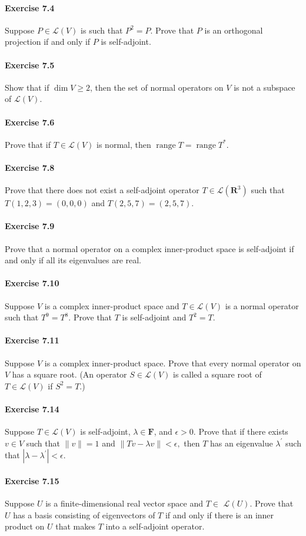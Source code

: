 \documentclass{article}
\theoremstyle{definition}
\begin{document}
\paragraph{Exercise 7.4} Suppose $P \in \mathcal{L}(V)$ is such that $P^{2}=P$. Prove that $P$ is an orthogonal projection if and only if $P$ is self-adjoint.

\paragraph{Exercise 7.5} Show that if $\operatorname{dim} V \geq 2$, then the set of normal operators on $V$ is not a subspace of $\mathcal{L}(V)$.

\paragraph{Exercise 7.6} Prove that if $T \in \mathcal{L}(V)$ is normal, then $\operatorname{range} T=\operatorname{range} T^{*}.$

\paragraph{Exercise 7.8} Prove that there does not exist a self-adjoint operator $T \in \mathcal{L}\left(\mathbf{R}^{3}\right)$ such that $T(1,2,3)=(0,0,0)$ and $T(2,5,7)=(2,5,7)$.

\paragraph{Exercise 7.9} Prove that a normal operator on a complex inner-product space is self-adjoint if and only if all its eigenvalues are real.

\paragraph{Exercise 7.10} Suppose $V$ is a complex inner-product space and $T \in \mathcal{L}(V)$ is a normal operator such that $T^{9}=T^{8}$. Prove that $T$ is self-adjoint and $T^{2}=T$.

\paragraph{Exercise 7.11} Suppose $V$ is a complex inner-product space. Prove that every normal operator on $V$ has a square root. (An operator $S \in \mathcal{L}(V)$ is called a square root of $T \in \mathcal{L}(V)$ if $S^{2}=T$.)

\paragraph{Exercise 7.14} Suppose $T \in \mathcal{L}(V)$ is self-adjoint, $\lambda \in \mathbf{F}$, and $\epsilon>0$. Prove that if there exists $v \in V$ such that $\|v\|=1$ and $\|T v-\lambda v\|<\epsilon,$ then $T$ has an eigenvalue $\lambda^{\prime}$ such that $\left|\lambda-\lambda^{\prime}\right|<\epsilon$.

\paragraph{Exercise 7.15} Suppose $U$ is a finite-dimensional real vector space and $T \in$ $\mathcal{L}(U)$. Prove that $U$ has a basis consisting of eigenvectors of $T$ if and only if there is an inner product on $U$ that makes $T$ into a self-adjoint operator.
\end{document}
